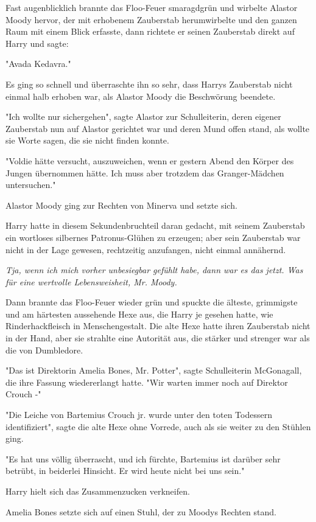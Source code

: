 {Fast augenblicklich brannte das Floo-Feuer smaragdgrün und wirbelte Alastor Moody hervor, der mit erhobenem Zauberstab herumwirbelte und den ganzen Raum mit einem Blick erfasste, dann richtete er seinen Zauberstab direkt auf Harry und sagte:

"Avada Kedavra."

Es ging so schnell und überraschte ihn so sehr, dass Harrys Zauberstab nicht einmal halb erhoben war, als Alastor Moody die Beschwörung beendete.

"Ich wollte nur sichergehen", sagte Alastor zur Schulleiterin, deren eigener Zauberstab nun auf Alastor gerichtet war und deren Mund offen stand, als wollte sie Worte sagen, die sie nicht finden konnte.

"Voldie hätte versucht, auszuweichen, wenn er gestern Abend den Körper des Jungen übernommen hätte. Ich muss aber trotzdem das Granger-Mädchen untersuchen."

Alastor Moody ging zur Rechten von Minerva und setzte sich.

Harry hatte in diesem Sekundenbruchteil daran gedacht, mit seinem Zauberstab ein wortloses silbernes Patronus-Glühen zu erzeugen; aber sein Zauberstab war nicht in der Lage gewesen, rechtzeitig anzufangen, nicht einmal annähernd.

\emph{Tja, wenn ich mich vorher unbesiegbar gefühlt habe, dann war es das jetzt. Was für eine wertvolle Lebensweisheit, Mr. Moody.}

Dann brannte das Floo-Feuer wieder grün und spuckte die älteste, grimmigste und am härtesten aussehende Hexe aus, die Harry je gesehen hatte, wie Rinderhackfleisch in Menschengestalt. Die alte Hexe hatte ihren Zauberstab nicht in der Hand, aber sie strahlte eine Autorität aus, die stärker und strenger war als die von Dumbledore.

"Das ist Direktorin Amelia Bones, Mr. Potter", sagte Schulleiterin McGonagall, die ihre Fassung wiedererlangt hatte. "Wir warten immer noch auf Direktor Crouch -"

"Die Leiche von Bartemius Crouch jr. wurde unter den toten Todessern identifiziert", sagte die alte Hexe ohne Vorrede, auch als sie weiter zu den Stühlen ging.

"Es hat uns völlig überrascht, und ich fürchte, Bartemius ist darüber sehr betrübt, in beiderlei Hinsicht. Er wird heute nicht bei uns sein."

Harry hielt sich das Zusammenzucken verkneifen.

Amelia Bones setzte sich auf einen Stuhl, der zu Moodys Rechten stand.

}
